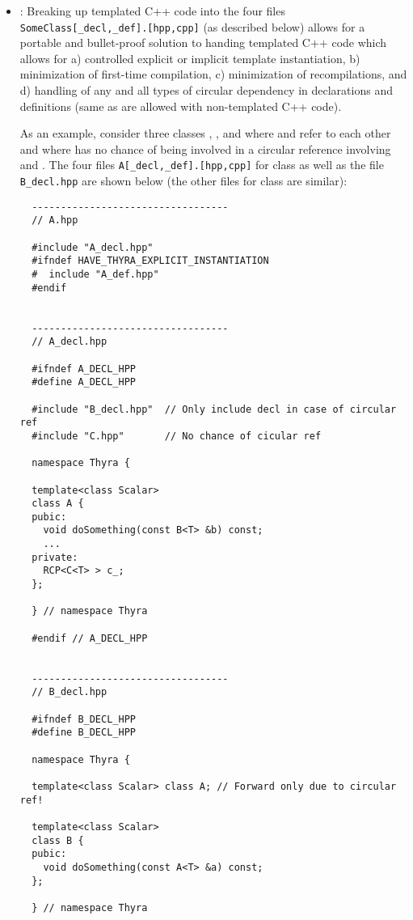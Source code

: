\begin{itemize}
{}\item\GCGTemplateHeaders\label{gcg:template-instantation-files}:
Breaking up templated C++ code into the four files
{}\texttt{SomeClass[\_decl,\_def].[hpp,cpp]} (as described below)
allows for a portable and bullet-proof solution to handing templated
C++ code which allows for a) controlled explicit or implicit template
instantiation, b) minimization of first-time compilation, c)
minimization of recompilations, and d) handling of any and all types
of circular dependency in declarations and definitions (same as are
allowed with non-templated C++ code).

As an example, consider three classes {}, {}, and {}
where {} and {} refer to each other and where {} has no
chance of being involved in a circular reference involving {} and
{}.  The four files {}\texttt{A[\_decl,\_def].[hpp,cpp]} for class
{} as well as the file {}\texttt{B\_decl.hpp} are shown below (the
other files for class {} are similar):


{\small\begin{verbatim}
  ----------------------------------
  // A.hpp

  #include "A_decl.hpp"
  #ifndef HAVE_THYRA_EXPLICIT_INSTANTIATION
  #  include "A_def.hpp"
  #endif


  ----------------------------------
  // A_decl.hpp

  #ifndef A_DECL_HPP
  #define A_DECL_HPP

  #include "B_decl.hpp"  // Only include decl in case of circular ref
  #include "C.hpp"       // No chance of cicular ref

  namespace Thyra {

  template<class Scalar>
  class A {
  pubic:
    void doSomething(const B<T> &b) const;
    ...
  private:
    RCP<C<T> > c_;
  };

  } // namespace Thyra

  #endif // A_DECL_HPP


  ----------------------------------
  // B_decl.hpp

  #ifndef B_DECL_HPP
  #define B_DECL_HPP

  namespace Thyra {

  template<class Scalar> class A; // Forward only due to circular ref!

  template<class Scalar>
  class B {
  pubic:
    void doSomething(const A<T> &a) const;
  };

  } // namespace Thyra


\end{verbatim}}
\end{itemize}
